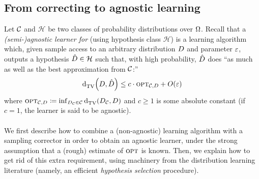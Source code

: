 \subsection{From correcting to agnostic learning}\label{ssec:connections:agnostic}

Let $\mathcal{C}$  and $\mathcal{H}$ be two classes of probability distributions over ${\Omega}$. Recall that a \emph{(semi-)agnostic learner for \class} (using hypothesis class $\mathcal{H}$) is a learning algorithm \Algo which, given sample access to an arbitrary distribution $D$ 
and parameter $\varepsilon$, outputs a hypothesis $\hat{D}\in\mathcal{H}$ such that, with high probability, $\hat{D}$ does ``as much as well as the best approximation from $ \mathcal{C}$:''
\[
	\totalvardist{\D}{\hat{\D}} \leq c\cdot\opt_{\class,\D} + \bigO{\eps}
\]
where ${\textsc{opt}}_{\mathcal{C},D}\coloneqq \inf_{D_{\mathcal{C}}\in\mathcal{C}} {\operatorname{d}_{\textrm{TV}}^{}\!\left({D_{\mathcal{C}}, D}\right)}$ and $c\geq 1$ is some absolute constant (if $c=1$, the learner is said to be agnostic).


\paragraph*{} We first describe how to combine a (non-agnostic) learning algorithm with a sampling corrector in order to obtain an agnostic learner, under the strong assumption that a (rough) estimate of ${\textsc{opt}}$ is known. Then, we explain how to get rid of this extra requirement, using machinery from the distribution learning literature (namely, an efficient \emph{hypothesis selection} procedure).

